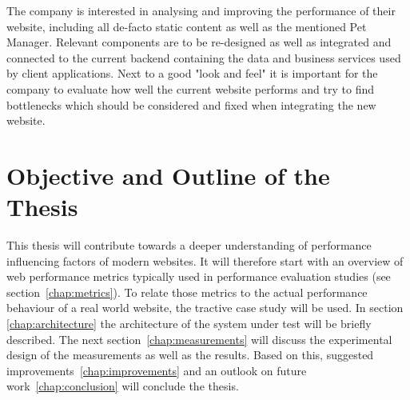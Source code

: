 The company is interested in analysing and improving the performance of their website, including all de-facto static content as well as the mentioned Pet Manager. Relevant components are to be re-designed as well as integrated and connected to the current backend containing the data and business services used by client applications. Next to a good "look and feel" it is important for the company to evaluate how well the current website performs and try to find bottlenecks which should be considered and fixed when integrating the new website.     

\section{Objective and Outline of the Thesis}

This thesis will contribute towards a deeper understanding of performance influencing factors of modern websites.
It will therefore start with an overview of web performance metrics typically used in performance evaluation studies (see section~\ref{chap:metrics}).
To relate those metrics to the actual performance behaviour of a real world website, the tractive case study will be used. 
In section \ref{chap:architecture} the architecture of the system under test will be briefly described.
The next section~\ref{chap:measurements} will discuss the  experimental design of the measurements as well as the results.
Based on this, suggested improvements~\ref{chap:improvements}  and an outlook on future work~\ref{chap:conclusion} will conclude the thesis.